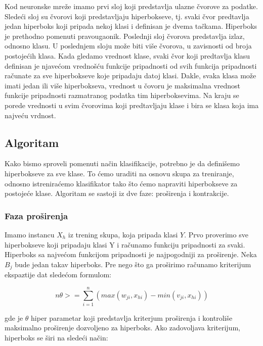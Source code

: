 \documentclass[a4paper]{article}
\begin{document}
Kod neuronske mreže imamo prvi sloj koji predstavlja ulazne čvorove za podatke. Sledeći sloj su čvorovi koji predstavljaju hiperbokseve, tj. 
svaki čvor predtavlja jedan hiperboks koji pripada nekoj klasi i definisan je dvema tačkama. Hiperboks je prethodno pomenuti 
pravougaonik. Poslednji sloj čvorova predstavlja izlaz, odnosno klasu. U poslednjem sloju može biti više čvorova, u zavisnosti od broja 
postojećih klasa. Kada gledamo vrednost klase, svaki čvor koji predtavlja klasu definisan je njavećom vrednošću funkcije pripadnosti od 
svih funkcija pripadnosti računate za sve hiperbokseve koje pripadaju datoj klasi. Dakle, svaka klasa može imati jedan ili više hiperbokseva, 
vrednost u čovoru je maksimalna vrednost funkcije pripadnosti razmatranog podatka tim hiperboksevima. Na kraju se porede vrednosti u 
svim čvorovima koji predtavljaju klase i bira se klasa koja ima najveću vrdnost. \cite{mmf}

\subsection{Algoritam}
\label{algoritam}

Kako bismo sproveli pomenuti način klasifikacije, potrebno je da definišemo hiperbokseve za sve klase. To ćemo uraditi na osnovu skupa za 
treniranje, odnosno istreniraćemo klasifikator tako što ćemo napraviti hiperbokseve za postojeće klase. Algoritam se sastoji iz dve faze: 
proširenja i kontrakcije. \cite{mmf}

\subsubsection{Faza proširenja}
\label{prosirenje}

Imamo instancu $X_h$ iz trening skupa, koja pripada klasi $Y$. Prvo proverimo sve hiperbokseve koji pripadaju klasi Y i računamo funkciju 
pripadnosti za svaki. Hiperboks sa najvećom funkcijom pripadnosti je najpogodniji za proširenje. Neka $B_j$ bude jedan takav hiperboks. 
Pre nego što ga proširimo računamo kriterijum ekspaztije dat sledećom formulom:

\begin{equation}
    n\theta >= \sum_{i=1}^{n}(max(w_{ji}, x_{hi}) - min(v_{ji}, x_{hi}))
\end{equation}

gde je $\theta$ hiper parametar koji predstavlja kriterjum proširenja i kontroliše maksimalno proširenje dozvoljeno za hiperboks. Ako 
zadovoljava kriterijum, hiperboks se širi na sledeći način:
\end{document}
